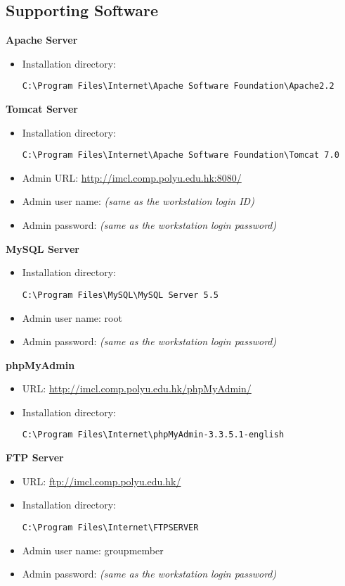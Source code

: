 \subsection{Supporting Software}
\textbf{Apache Server}
\begin{itemize}
\item Installation directory: \begin{verbatim}C:\Program Files\Internet\Apache Software Foundation\Apache2.2\end{verbatim}
\end{itemize}
\textbf{Tomcat Server}
\begin{itemize}
\item Installation directory: \begin{verbatim}C:\Program Files\Internet\Apache Software Foundation\Tomcat 7.0\end{verbatim}
\item Admin URL: \url{http://imcl.comp.polyu.edu.hk:8080/}
\item Admin user name: \emph{(same as the workstation login ID)}
\item Admin password: \emph{(same as the workstation login password)}
\end{itemize}
\textbf{MySQL Server}
\begin{itemize}
\item Installation directory: \begin{verbatim}C:\Program Files\MySQL\MySQL Server 5.5\end{verbatim}
\item Admin user name: root
\item Admin password: \emph{(same as the workstation login password)}
\end{itemize}
\textbf{phpMyAdmin}
\begin{itemize}
\item URL: \url{http://imcl.comp.polyu.edu.hk/phpMyAdmin/}
\item Installation directory: \begin{verbatim}C:\Program Files\Internet\phpMyAdmin-3.3.5.1-english\end{verbatim}
\end{itemize}
\textbf{FTP Server}
\begin{itemize}
\item URL: \url{ftp://imcl.comp.polyu.edu.hk/}
\item Installation directory: \begin{verbatim}C:\Program Files\Internet\FTPSERVER\end{verbatim}
\item Admin user name: groupmember
\item Admin password: \emph{(same as the workstation login password)}
\end{itemize}
